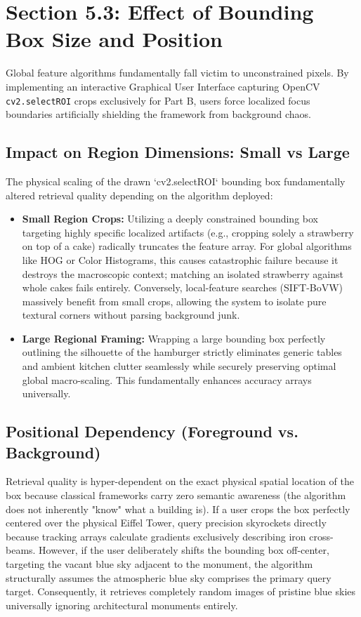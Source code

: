 \documentclass[11pt, a4paper]{article}
\begin{document}
\section{Section 5.3: Effect of Bounding Box Size and Position}
Global feature algorithms fundamentally fall victim to unconstrained pixels. By implementing an interactive Graphical User Interface capturing OpenCV \texttt{cv2.selectROI} crops exclusively for Part B, users force localized focus boundaries artificially shielding the framework from background chaos.

\subsection{Impact on Region Dimensions: Small vs Large}
The physical scaling of the drawn `cv2.selectROI` bounding box fundamentally altered retrieval quality depending on the algorithm deployed:
\begin{itemize}
    \item \textbf{Small Region Crops:} Utilizing a deeply constrained bounding box targeting highly specific localized artifacts (e.g., cropping solely a strawberry on top of a cake) radically truncates the feature array. For global algorithms like HOG or Color Histograms, this causes catastrophic failure because it destroys the macroscopic context; matching an isolated strawberry against whole cakes fails entirely. Conversely, local-feature searches (SIFT-BoVW) massively benefit from small crops, allowing the system to isolate pure textural corners without parsing background junk.
    \item \textbf{Large Regional Framing:} Wrapping a large bounding box perfectly outlining the silhouette of the hamburger strictly eliminates generic tables and ambient kitchen clutter seamlessly while securely preserving optimal global macro-scaling. This fundamentally enhances accuracy arrays universally.
\end{itemize}

\subsection{Positional Dependency (Foreground vs. Background)}
Retrieval quality is hyper-dependent on the exact physical spatial location of the box because classical frameworks carry zero semantic awareness (the algorithm does not inherently "know" what a building is).
If a user crops the box perfectly centered over the physical Eiffel Tower, query precision skyrockets directly because tracking arrays calculate gradients exclusively describing iron cross-beams. However, if the user deliberately shifts the bounding box off-center, targeting the vacant blue sky adjacent to the monument, the algorithm structurally assumes the atmospheric blue sky comprises the primary query target. Consequently, it retrieves completely random images of pristine blue skies universally ignoring architectural monuments entirely.
\end{document}
